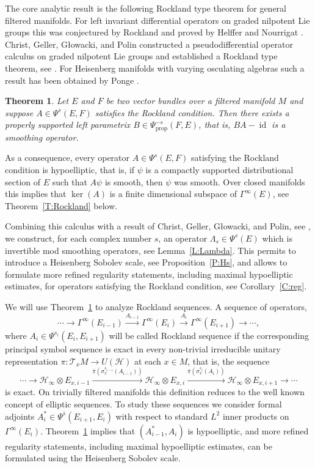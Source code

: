 \documentclass[reqno,12pt]{amsart}
\DeclareMathOperator{\id}{id}
\newcommand\prop{\textrm{prop}}
\newcounter{ABC}
\theoremstyle{plain}
\newtheorem{thm}[ABC]{Theorem}
\theoremstyle{definition}
\begin{document}
The core analytic result is the following Rockland type theorem for general filtered manifolds.
For left invariant differential operators on graded nilpotent Lie groups this was conjectured by Rockland \cite{R78} and proved by Helffer and Nourrigat \cite{HN79}.
Christ, Geller, G{\l}owacki, and Polin constructed a pseudodifferential operator calculus on graded nilpotent Lie groups and established a Rockland type theorem, see \cite{CGGP92}.
For Heisenberg manifolds with varying osculating algebras such a result has been obtained by Ponge \cite{P08}.


\begin{thm}\label{thmA}
Let $E$ and $F$ be two vector bundles over a filtered manifold $M$ and suppose $A\in\Psi^s(E,F)$ satisfies the Rockland condition.
Then there exists a properly supported left parametrix $B\in\Psi^{-s}_\prop(F,E)$, that is, $BA-\id$ is a smoothing operator.
\end{thm}


As a consequence, every operator $A\in\Psi^s(E,F)$ satisfying the Rockland condition is hypoelliptic, that is, if $\psi$ is a compactly supported distributional section of $E$ such that $A\psi$ is smooth, then $\psi$ was smooth.
Over closed manifolds this implies that $\ker(A)$ is a finite dimensional subspace of $\Gamma^\infty(E)$, see Theorem~\ref{T:Rockland} below.


Combining this calculus with a result of Christ, Geller, G{\l}owacki, and Polin, see \cite[Theorem~6.1]{CGGP92}, we construct, for each complex number $s$, an operator $\Lambda_s\in\Psi^s(E)$ which is invertible mod smoothing operators, see Lemma~\ref{L:Lambda}.
This permits to introduce a Heisenberg Sobolev scale, see Proposition~\ref{P:Hs}, and allows to formulate more refined regularity statements, including maximal hypoelliptic estimates, for operators satisfying the Rockland condition, see Corollary~\ref{C:reg}.


We will use Theorem~\ref{thmA} to analyze Rockland sequences.
A sequence of operators,
$$
\cdots\to\Gamma^\infty(E_{i-1})\xrightarrow{A_{i-1}}\Gamma^\infty(E_i)\xrightarrow{A_i}\Gamma^\infty(E_{i+1})\to\cdots,
$$
where $A_i\in\Psi^{s_i}(E_i,E_{i+1})$ will be called Rockland sequence if the corresponding principal symbol sequence is exact in every non-trivial irreducible unitary representation $\pi\colon\mathcal T_xM\to U(\mathcal H)$ at each $x\in M$, that is, the sequence
$$
\cdots\to\mathcal H_\infty\otimes E_{x,i-1}\xrightarrow{\bar\pi(\sigma^{s_{i-1}}_x(A_{i-1}))}\mathcal H_\infty\otimes E_{x,i}\xrightarrow{\bar\pi(\sigma^{s_i}_x(A_i))}\mathcal H_\infty\otimes E_{x,i+1}\to\cdots
$$
is exact.
On trivially filtered manifolds this definition reduces to the well known concept of elliptic sequences.
To study these sequences we consider formal adjoints $A_i^*\in\Psi^{\bar s}(E_{i+1},E_i)$ with respect to standard $L^2$ inner products on $\Gamma^\infty(E_i)$.
Theorem~\ref{thmA} implies that $(A_{i-1}^*,A_i)$ is hypoelliptic, and more refined regularity statements, including maximal hypoelliptic estimates, can be formulated using the Heisenberg Sobolev scale.
\end{document}

